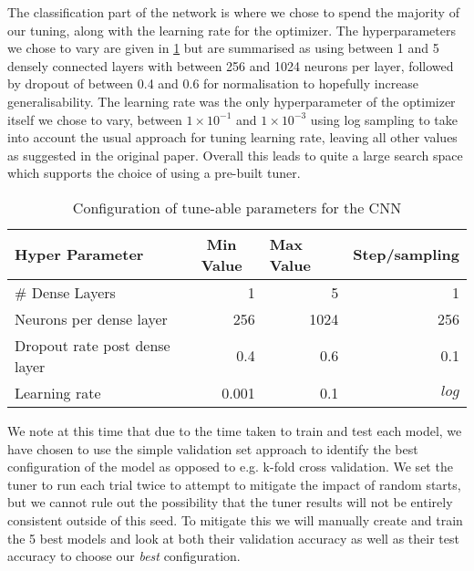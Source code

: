 \documentclass[12pt]{article}
\numberwithin{equation}{section}
\numberwithin{figure}{section}
\numberwithin{table}{section}
\begin{document}
The classification part of the network is where we chose to spend the majority of our tuning, along with the learning rate for the optimizer. The hyperparameters we chose to vary are given in \cref{tab:tuner_setup} but are summarised as using between 1 and 5 densely connected layers with between 256 and 1024 neurons per layer, followed by dropout of between 0.4 and 0.6 for normalisation to hopefully increase generalisability. The learning rate was the only hyperparameter of the optimizer itself we chose to vary, between $1\times 10^{-1}$ and $1\times 10^{-3}$ using log sampling to take into account the usual approach for tuning learning rate, leaving all other values as suggested in the original paper. Overall this leads to quite a large search space which supports the choice of using a pre-built tuner.
\begin{table}[]
  \centering
  \begin{tabular}{|l|r|r|r|}
  \hline
  \textbf{Hyper Parameter}      & \multicolumn{1}{c|}{\textbf{Min Value}} & \multicolumn{1}{l|}{\textbf{Max Value}} & \multicolumn{1}{l|}{\textbf{Step/sampling}} \\ \hline
  \# Dense Layers               & 1                                       & 5                                       & 1                                           \\ \hline
  Neurons per dense layer       & 256                                     & 1024                                    & 256                                         \\ \hline
  Dropout rate post dense layer & 0.4                                     & 0.6                                     & 0.1                                         \\ \hline
  Learning rate                 & 0.001                                   & 0.1                                     & $log$                                         \\ \hline
  \end{tabular}
  \caption{Configuration of tune-able parameters for the CNN}
  \label{tab:tuner_setup}
  \end{table}

We note at this time that due to the time taken to train and test each model, we have chosen to use the simple validation set approach to identify the best configuration of the model as opposed to e.g. k-fold cross validation. We set the tuner to run each trial twice to attempt to mitigate the impact of random starts, but we cannot rule out the possibility that the tuner results will not be entirely consistent outside of this seed. To mitigate this we will manually create and train the 5 best models and look at both their validation accuracy as well as their test accuracy to choose our \emph{best} configuration.
\end{document}
